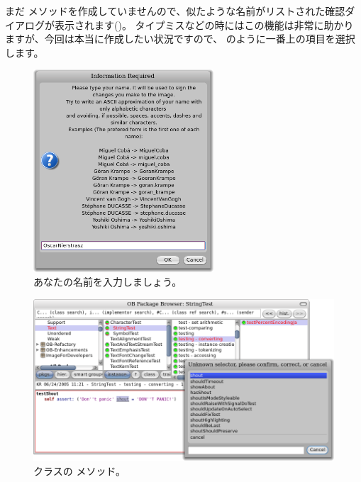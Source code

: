 \documentclass[a4paper,10pt,twoside]{book}
\begin{document}
まだ  メソッドを作成していませんので、似たような名前がリストされた確認ダイアログが表示されます()。
タイプミスなどの時にはこの機能は非常に助かりますが、今回は本当に作成したい状況ですので、 のように一番上の項目を選択します。



\begin{figure}[htb]
\centerline {\includegraphics[width=0.6\textwidth]{name}}
\caption{あなたの名前を入力しましょう。}
\end{figure}

\begin{figure}[htb]
\centerline {\includegraphics[width=\textwidth]{testShoutConfirm}}
\caption{ クラスの  メソッド。}
\end{figure}
\end{document}

